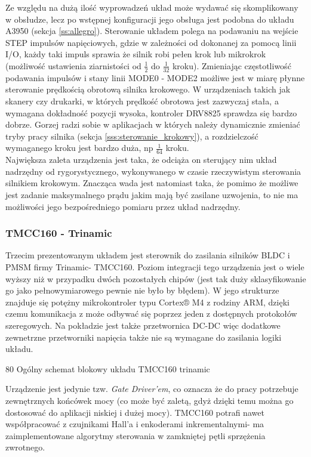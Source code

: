Ze względu na dużą ilość wyprowadzeń układ może wydawać się skomplikowany w obsłudze, lecz po wstępnej konfiguracji jego obsługa jest podobna do układu A3950 (sekcja \ref{ss:allegro}). Sterowanie układem polega na podawaniu na wejście STEP impulsów napięciowych, gdzie w zależności od dokonanej za pomocą linii I/O, każdy taki impuls sprawia że silnik robi pełen krok lub mikrokrok (możliwość ustawienia ziarnistości od $ \frac{1}{2} $ do $ \frac{1}{32} $ kroku). Zmieniając częstotliwość podawania impulsów i stany linii MODE0 - MODE2 możliwe jest w miarę płynne sterowanie prędkością obrotową silnika krokowego. W urządzeniach takich jak skanery czy drukarki, w których prędkość obrotowa jest zazwyczaj stała, a wymagana dokładność pozycji wysoka, kontroler DRV8825 sprawdza się bardzo dobrze. Gorzej radzi sobie w aplikacjach w których należy dynamicznie zmieniać tryby pracy silnika (sekcja \ref{sss:sterowanie_krokowy}), a rozdzielczość wymaganego kroku jest bardzo duża, np $ \frac{1}{64} $ kroku. \\

Największa zaleta urządzenia jest taka, że odciąża on sterujący nim układ nadrzędny od rygorystycznego, wykonywanego w czasie rzeczywistym sterowania silnikiem krokowym. Znacząca wada jest natomiast taka, że pomimo że możliwe jest zadanie maksymalnego prądu jakim mają być zasilane uzwojenia, to nie ma możliwości jego bezpośredniego pomiaru przez układ nadrzędny.

\subsubsection{TMCC160 - Trinamic}

Trzecim prezentowanym układem jest sterownik do zasilania silników BLDC i PMSM firmy Trinamic- TMCC160. Poziom integracji tego urządzenia jest o wiele wyższy niż w przypadku dwóch pozostałych chipów (jest tak duży sklasyfikowanie go jako pełnowymiarowego pewnie nie było by błędem). W jego strukturze znajduje się potężny mikrokontroler typu Cortex® M4 z rodziny ARM, dzięki czemu komunikacja z może odbywać się poprzez jeden z dostępnych protokołów szeregowych. Na pokładzie jest także przetwornica DC-DC więc dodatkowe zewnetrzne przetworniki napięcia także nie są wymagane do zasilania logiki układu. 

	{80}
	{Ogólny schemat blokowy układu TMCC160}
	{trinamic}

Urządzenie jest jedynie tzw. {\it Gate Driver'em}, co oznacza że do pracy potrzebuje zewnętrznych końcówek mocy (co może być zaletą, gdyż dzięki temu można go dostosować do aplikacji niskiej i dużej mocy). TMCC160 potrafi nawet współpracować z czujnikami Hall'a i enkoderami inkrementalnymi- ma zaimplementowane algorytmy sterowania w zamkniętej pętli sprzężenia zwrotnego. \\

